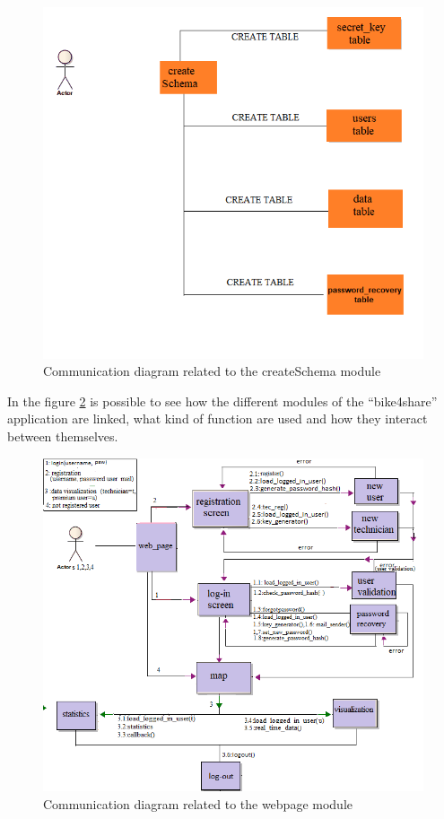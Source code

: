 \documentclass{article}
\begin{document}
\begin{figure}[H]
    \centering
    \includegraphics[width=0.65\linewidth]{image/COMM_TAB.png}
    \caption{Communication diagram related to the createSchema module}
    \label{fig:createSchema}
\end{figure}
In the figure \ref{fig:webpage} is possible to see how the different modules of the “bike4share” application are linked, what kind of function are used and how they interact between themselves.

\begin{figure}[H]
    \centering
    \includegraphics[width=0.75\linewidth]{image/comunication_architecture.png}
    \caption{Communication diagram related to the webpage module}
    \label{fig:webpage}
\end{figure}
\end{document}
